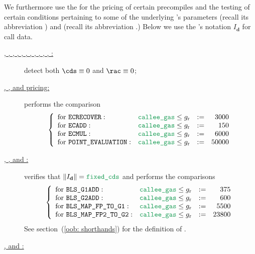 We furthermore use the \oobMod{} for the pricing of certain precompiles and the testing of certain conditions pertaining to some of the underlying 's parameters
\CDS{} (recall its abbreviation \cds{}) and
\RAC{} (recall its abbreviation \rac{}.)
\saNote{} Below we use the \cite{EYP-London}'s notation $I_\textbf{d}$ for call data.
\begin{description}
	\item[\underline{, , , , , , , , , , , :}]
		detect both $\cds \equiv 0$ and $\rac \equiv 0$; 
	\item[\underline{, ,  and  pricing:}]
		performs the comparison
		\[
			\left\{ \begin{array}{llcrcl}
				\text{for }\inst{ECRECOVER}       : & \locCalleeGas \leq g_\text{r} & := &  3000 \\
				\text{for }\inst{ECADD}           : & \locCalleeGas \leq g_\text{r} & := &   150 \\
				\text{for }\inst{ECMUL}           : & \locCalleeGas \leq g_\text{r} & := &  6000 \\
				\text{for }\inst{POINT\_EVALUATION} : & \locCalleeGas \leq g_\text{r} & := & 50000 \\
			\end{array} \right.
		\]
	\item[\underline{, ,  and :}]
		verifies that $\| I_\textbf{d} \| = \locFixedCds$ and performs the comparisons
		\[
			\left\{ \begin{array}{llcrcl}
				\text{for }\inst{BLS\_G1ADD}        	    : & \locCalleeGas \leq g_\text{r} & := &   375 \\
				\text{for }\inst{BLS\_G2ADD}        	    : & \locCalleeGas \leq g_\text{r} & := &   600 \\
				\text{for }\inst{BLS\_MAP\_FP\_TO\_G1} 	: & \locCalleeGas \leq g_\text{r} & := &  5500 \\
				\text{for }\inst{BLS\_MAP\_FP2\_TO\_G2} 	: & \locCalleeGas \leq g_\text{r} & := & 23800 \\
			\end{array} \right.
		\]
		See section~(\ref{oob: shorthands}) for the definition of \locFixedCds{}.	
	\item[\underline{,  and :}]

\end{description}
